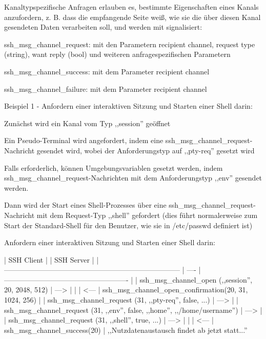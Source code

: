 \documentclass[a4paper]{article}
\begin{document}
\begin{multicols}{3}
\begin{itemize*}
\begin{itemize*}
            \end{itemize*}
            \item Kanaltypspezifische Anfragen erlauben es, bestimmte Eigenschaften eines Kanals anzufordern, z. B. dass die empfangende Seite weiß, wie sie die über diesen Kanal gesendeten Daten verarbeiten soll, und werden mit signalisiert:
            \begin{itemize*}
                  \item ssh\_msg\_channel\_request: mit den Parametern recipient channel, request type (string), want reply (bool) und weiteren anfragespezifischen Parametern
                  \item ssh\_msg\_channel\_success: mit dem Parameter recipient channel
                  \item ssh\_msg\_channel\_failure: mit dem Parameter recipient channel
            \end{itemize*}
            \item Beispiel 1 - Anfordern einer interaktiven Sitzung und Starten einer Shell darin:
            \begin{itemize*}
                  \item Zunächst wird ein Kanal vom Typ ,,session'' geöffnet
                  \item Ein Pseudo-Terminal wird angefordert, indem eine ssh\_msg\_channel\_request-Nachricht gesendet wird, wobei der Anforderungstyp auf ,,pty-req'' gesetzt wird
                  \item Falls erforderlich, können Umgebungsvariablen gesetzt werden, indem ssh\_msg\_channel\_request-Nachrichten mit dem Anforderungstyp ,,env'' gesendet werden.
                  \item Dann wird der Start eines Shell-Prozesses über eine ssh\_msg\_channel\_request-Nachricht mit dem Request-Typ ,,shell'' gefordert (dies führt normalerweise zum Start der Standard-Shell für den Benutzer, wie sie in /etc/passwd definiert ist)
                  \item Anfordern einer interaktiven Sitzung und Starten einer Shell darin:

                  | SSH Client | | SSH Server | | -------------------------------------------------------------------------- | ---- | ---------------------------------------------------- | | ssh\_msg\_channel\_open (,,session'', 20, 2048, 512) | --->{} | | | \textless--- | ssh\_msg\_channel\_open\_confirmation(20, 31, 1024, 256) | | ssh\_msg\_channel\_request (31, ,,pty-req'', false, ...) | --->{} | | ssh\_msg\_channel\_request (31, ,,env'', false, ,,home'', ,,/home/username'') | --->{} | | ssh\_msg\_channel\_request (31, ,,shell'', true, ...) | --->{} | | | \textless--- | ssh\_msg\_channel\_success(20) |
                  ,,Nutzdatenaustausch findet ab jetzt statt...''
            \end{itemize*}
      \end{itemize*}


\end{multicols}
\end{document}
